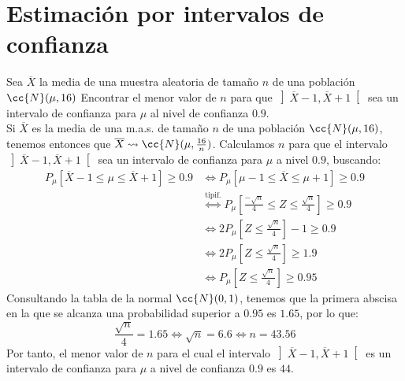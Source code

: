 \newpage
\section{Estimación por intervalos de confianza}

\begin{ejercicio}
    Sea $\overline{X}$ la media de una muestra aleatoria de tamaño $n$ de una población $\cc{N}(\mu, 16)$ Encontrar el menor valor de $n$ para que $\left]\overline{X}-1,\overline{X}+1\right[$ sea un intervalo de confianza para $\mu$ al nivel de confianza $0.9$.\\

    \noindent
    Si $\overline{X}$ es la media de una m.a.s. de tamaño $n$ de una población $\cc{N}(\mu,16)$, tenemos entonces que $\overline{X}\rightsquigarrow\cc{N}(\mu, \frac{16}{n})$. Calculamos $n$ para que el intervalo $\left]\overline{X}-1,\overline{X}+1\right[$ sea un intervalo de confianza para $\mu$ a nivel $0.9$, buscando:
    \begin{align*}
        P_\mu\left[\overline{X}-1 \leq \mu \leq \overline{X}+1\right] \geq 0.9 &\Longleftrightarrow P_\mu[\mu-1\leq \overline{X}\leq \mu+1] \geq 0.9 \\
                                                                    &\stackrel{\text{tipif.}}{\Longleftrightarrow} P_\mu\left[\frac{-\sqrt{n}}{4} \leq Z \leq \frac{\sqrt{n}}{4}\right] \geq 0.9 \\
                                                                    &\Longleftrightarrow 2P_\mu\left[Z\leq \frac{\sqrt{n}}{4}\right] - 1 \geq 0.9 \\
                                                                    &\Longleftrightarrow 2P_\mu\left[Z\leq \frac{\sqrt{n}}{4}\right] \geq 1.9 \\
                                                                    &\Longleftrightarrow P_\mu\left[Z\leq \frac{\sqrt{n}}{4}\right] \geq 0.95 
    \end{align*}
    Consultando la tabla de la normal $\cc{N}(0,1)$, tenemos que la primera abscisa en la que se alcanza una probabilidad superior a $0.95$ es $1.65$, por lo que:
    \begin{equation*}
        \frac{\sqrt{n}}{4} = 1.65 \Longleftrightarrow \sqrt{n} = 6.6 \Longleftrightarrow n = 43.56
    \end{equation*}
    Por tanto, el menor valor de $n$ para el cual el intervalo $\left]\overline{X}-1,\overline{X}+1\right[$ es un intervalo de confianza para $\mu$ a nivel de confianza $0.9$ es $44$.
\end{ejercicio}

